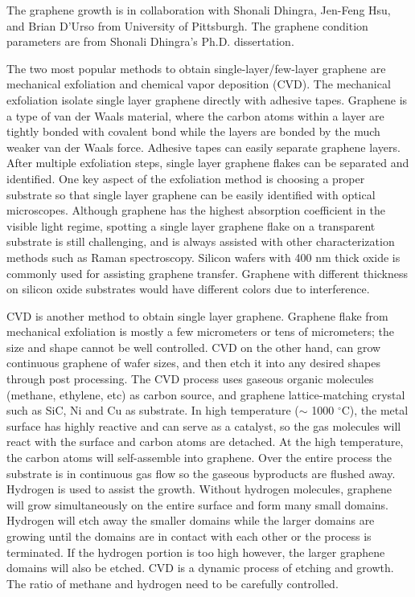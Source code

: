 \documentclass[pdflatex, sectionletters, 12pt]{pittetd}    %
\begin{document}
The graphene growth is in collaboration with Shonali Dhingra, Jen-Feng Hsu, and Brian D'Urso from University of Pittsburgh. The graphene condition parameters are from Shonali Dhingra's Ph.D. dissertation\cite{dhingra2015quadratic}.

The two most popular methods to obtain single-layer/few-layer graphene are mechanical exfoliation and chemical vapor deposition (CVD). The mechanical exfoliation isolate single layer graphene directly with adhesive tapes. Graphene is a type of van der Waals material, where the carbon atoms within a layer are tightly bonded with covalent bond while the layers are bonded by the much weaker van der Waals force. Adhesive tapes can easily separate graphene layers. After multiple exfoliation steps, single layer graphene flakes can be separated and identified\cite{novoselov2004electric}. One key aspect of the exfoliation method is choosing a proper substrate so that single layer graphene can be easily identified with optical microscopes. Although graphene has the highest absorption coefficient in the visible light regime\cite{nair2008fine}, spotting a single layer graphene flake on a transparent substrate is still challenging, and is always assisted with other characterization methods such as Raman spectroscopy\cite{ferrari2006raman}. Silicon wafers with 400 nm thick oxide is commonly used for assisting graphene transfer. Graphene with different thickness on silicon oxide substrates would have different colors due to interference. 

CVD is another method to obtain single layer graphene. Graphene flake from mechanical exfoliation is mostly a few micrometers or tens of micrometers; the size and shape cannot be well controlled. CVD on the other hand, can grow continuous graphene of wafer sizes\cite{lee2010wafer}, and then etch it into any desired shapes through post processing. The CVD process uses gaseous organic molecules (methane, ethylene, etc) as carbon source, and graphene lattice-matching crystal such as SiC, Ni and Cu as substrate. In high temperature ($\sim$ 1000 $^{\circ}$C), the metal surface has highly reactive and can serve as a catalyst, so the gas molecules will react with the surface and carbon atoms are detached. At the high temperature, the carbon atoms will self-assemble into graphene. Over the entire process the substrate is in continuous gas flow so the gaseous byproducts are flushed away. Hydrogen is used to assist the growth. Without hydrogen molecules, graphene will grow simultaneously on the entire surface and form many small domains. Hydrogen will etch away the smaller domains while the larger domains are growing\cite{vlassiouk2011role, zhang2012anisotropic} until the domains are in contact with each other or the process is terminated. If the hydrogen portion is too high however, the larger graphene domains will also be etched. CVD is a dynamic process of etching and growth. The ratio of methane and hydrogen need to be carefully controlled.
\end{document}
